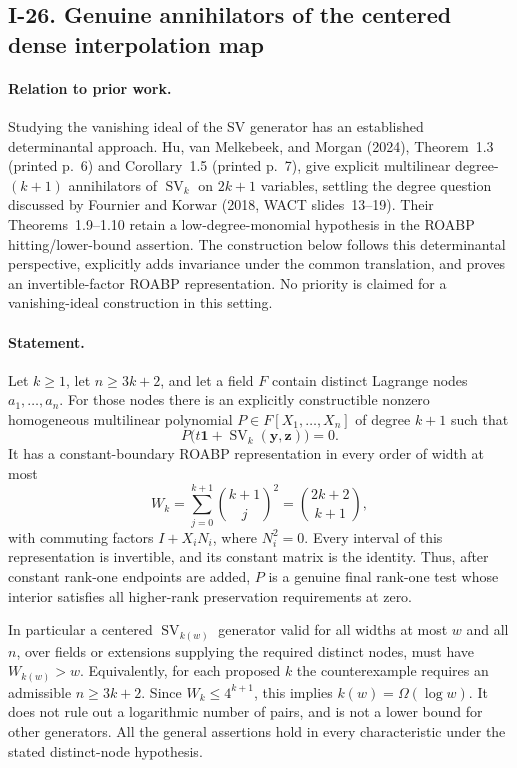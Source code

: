 \subsection{I-26. Genuine annihilators of the centered dense interpolation map}
\label{I-26}

\paragraph{Relation to prior work.}
Studying the vanishing ideal of the SV generator has an established
determinantal approach.  Hu, van Melkebeek, and Morgan (2024),
Theorem~1.3 (printed p.~6) and Corollary~1.5 (printed p.~7), give explicit
multilinear degree-$(k+1)$ annihilators of $\operatorname{SV}_k$
on $2k+1$ variables, settling the degree question discussed by
Fournier and Korwar (2018, WACT slides~13--19).
Their Theorems~1.9--1.10 retain a low-degree-monomial hypothesis
in the ROABP hitting/lower-bound assertion.  The construction
below follows this determinantal perspective, explicitly adds
invariance under the common translation, and proves an
invertible-factor ROABP representation.  No priority is claimed
for a vanishing-ideal construction in this setting.

\paragraph{Statement.}
Let $k\ge1$, let $n\ge3k+2$, and let a field $F$ contain
distinct Lagrange nodes $a_1,\ldots,a_n$.  For those nodes there
is an explicitly constructible nonzero homogeneous multilinear
polynomial $P\in F[X_1,\ldots,X_n]$ of degree $k+1$ such that
\[
 P\bigl(t\mathbf1+\operatorname{SV}_k(\mathbf y,\mathbf z)\bigr)=0.
 \tag{I.32}\label{eq:I-centered-sv-zero}
\]
It has a constant-boundary ROABP representation in every order
of width at most
\[
 W_k=\sum_{j=0}^{k+1}\binom{k+1}{j}^{\!2}
       =\binom{2k+2}{k+1},
 \tag{I.33}\label{eq:I-centered-sv-width}
\]
with commuting factors $I+X_iN_i$, where $N_i^2=0$.
Every interval of this representation is invertible, and its
constant matrix is the identity.  Thus, after constant
rank-one endpoints are added, $P$ is a genuine final rank-one
test whose interior satisfies all higher-rank preservation
requirements at zero.

In particular a centered $\operatorname{SV}_{k(w)}$ generator
valid for all widths at most $w$ and all $n$, over fields or
extensions supplying the required distinct nodes, must have
$W_{k(w)}>w$.  Equivalently, for each proposed $k$ the
counterexample requires an admissible $n\ge3k+2$.
Since $W_k\le4^{k+1}$, this implies
$k(w)=\Omega(\log w)$.  It does not rule out a logarithmic
number of pairs, and is not a lower bound for other generators.
All the general assertions hold in every characteristic under
the stated distinct-node hypothesis.

